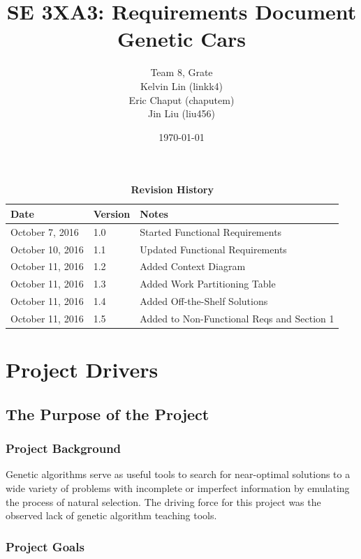 \documentclass[12pt, titlepage]{article}
\title{SE 3XA3: Requirements Document\\Genetic Cars}
\author{Team 8, Grate
		\\ Kelvin Lin (linkk4)
		\\ Eric Chaput (chaputem)
		\\ Jin Liu (liu456)
}
\date{\today}
\begin{document}
\maketitle

\tableofcontents
\listoftables
\listoffigures

\begin{table}[h]
\caption{\bf Revision History}
\begin{tabularx}{\textwidth}{p{3.5cm}p{2cm}X}
\toprule {\bf Date} & {\bf Version} & {\bf Notes}\\
\midrule
October 7, 2016 & 1.0 & Started Functional Requirements\\
October 10, 2016 & 1.1 & Updated Functional Requirements\\
October 11, 2016 & 1.2 & Added Context Diagram\\
October 11, 2016 & 1.3 & Added Work Partitioning Table\\
October 11, 2016 & 1.4 & Added Off-the-Shelf Solutions\\
October 11, 2016 & 1.5 & Added to Non-Functional Reqs and Section 1\\
\bottomrule
\end{tabularx}
\end{table}

\newpage


\section{Project Drivers}

\subsection{The Purpose of the Project}

\subsubsection{Project Background}

Genetic algorithms serve as useful tools to search for near-optimal solutions to 
a wide variety of problems with incomplete or imperfect information by emulating 
the process of natural selection. The driving force for this project was the 
observed lack of genetic algorithm teaching tools. 

\subsubsection{Project Goals}
\end{document}
